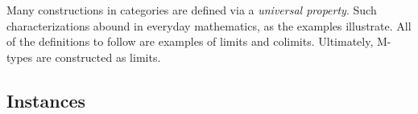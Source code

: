 \documentclass[a5paper]{article}
\newcommand{\dual}[2]{
  \begin{itemize}\renewcommand{\labelitemi}{$\circ $}
    \itemsep0em
    \item #1
    \item #2
   \end{itemize}
}
\begin{document}
Many constructions in categories are defined via a \textit{universal property}.
Such characterizations abound in everyday mathematics, as the examples
illustrate. All of the definitions to follow are examples of limits and colimits.
Ultimately, M-types are constructed as limits.

\subsection{Instances}

\end{document}
